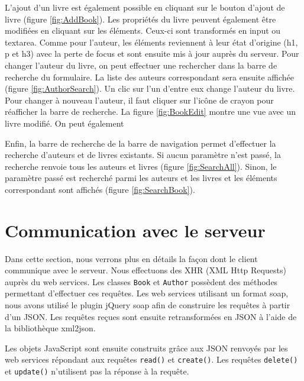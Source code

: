 
L'ajout d'un livre est également possible en cliquant sur le bouton d'ajout de livre (figure \ref{fig:AddBook}). Les propriétés du livre peuvent également être modifiées en cliquant sur les éléments. Ceux-ci sont transformés en input ou textarea. Comme pour l'auteur, les éléments reviennent à leur état d'origine (h1, p et h3) avec la perte de focus et sont ensuite mis à jour auprès du serveur. Pour changer l'auteur du livre, on peut effectuer une rechercher dans la barre de recherche du formulaire. La liste des auteurs correspondant sera ensuite affichée (figure \ref{fig:AuthorSearch}). Un clic sur l'un d'entre eux change l'auteur du livre. Pour changer à nouveau l'auteur, il faut cliquer sur l'icône de crayon pour réafficher la barre de recherche. La figure \ref{fig:BookEdit} montre une vue avec un livre modifié. On peut également


Enfin, la barre de recherche de la barre de navigation permet d'effectuer la recherche d'auteurs et de livres existants. Si aucun paramètre n'est passé, la recherche renvoie tous les auteurs et livres (figure \ref{fig:SearchAll}). Sinon, le paramètre passé est recherché parmi les auteurs et les livres et les éléments correspondant sont affichés (figure \ref{fig:SearchBook}).


\section{Communication avec le serveur}
Dans cette section, nous verrons plus en détails la façon dont le client communique avec le serveur. Nous effectuons des XHR (XML Http Requests) auprès du web services. Les classes \texttt{Book} et \texttt{Author} possèdent des méthodes permettant d'effectuer ces requêtes. Les web services utilisant un format soap, nous avons utilisé le plugin jQuery soap afin de construire les requêtes à partir d'un JSON. Les requêtes reçues sont ensuite retransformées en JSON à l'aide de la bibliothèque xml2json. 

Les objets JavaScript sont ensuite construits grâce aux JSON renvoyés par les web services répondant aux requêtes \texttt{read()} et \texttt{create()}. Les requêtes \texttt{delete()} et \texttt{update()} n'utilisent pas la réponse à la requête.
